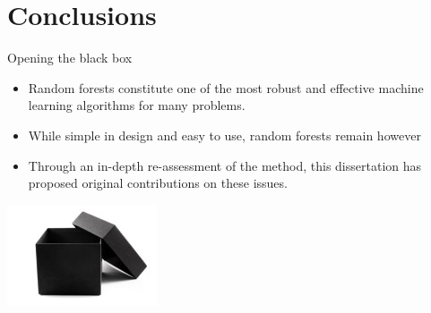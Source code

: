 \documentclass{beamer}
\begin{document}

\section{Conclusions}

\begin{frame}{Opening the black box}
\begin{itemize}

\item Random forests constitute one of the most {\color{blue} robust and
effective} machine learning algorithms for many problems.

\medskip

\item While simple in design and easy to use, random forests remain however

\medskip

\item Through an in-depth re-assessment of the method, this dissertation has
proposed {\color{blue} original contributions} on these issues.

\end{itemize}

\begin{center}
\includegraphics[scale=0.5]{figures/blackbox-open.jpg}
\end{center}

\end{frame}
\end{document}
